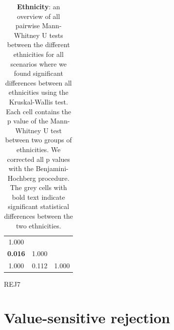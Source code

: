 \begin{table}
\begin{subtable}{.21\textwidth}
\begin{tabular}{ccc}
            \midrule
            1.000                                  &                           &                           \\
            \cellcolor[HTML]{EFEFEF}\textbf{0.016} & \multicolumn{1}{r}{1.000} &                           \\
            1.000                                  & \multicolumn{1}{r}{0.112} & \multicolumn{1}{r}{1.000} \\
            \bottomrule
        \end{tabular}
        \caption{REJ7}
    \end{subtable}
    \caption{\textbf{Ethnicity}: an overview of all pairwise Mann-Whitney U tests between the different ethnicities for all scenarios where we found significant differences between all ethnicities using the Kruskal-Wallis test. Each cell contains the p value of the Mann-Whitney U test between two groups of ethnicities. We corrected all p values with the Benjamini-Hochberg procedure. The grey cells with bold text indicate significant statistical differences between the two ethnicities.}
    \label{tab:results-pairwise-ethnicity}
\end{table}

\section{Value-sensitive rejection}
\label{sec:results-rejector}

